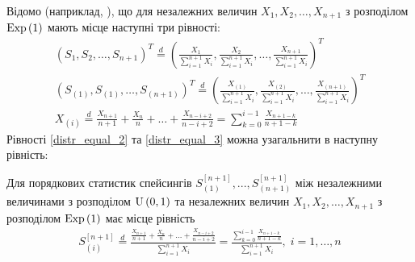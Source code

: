 Відомо (наприклад, \cite{Holst_1980}), що для незалежних величин 
$X_1, X_2, \dots, X_{n+1}$ з розподілом $\mathrm{Exp}\left(1\right)$
мають місце наступні три рівності:
\begin{gather}
    \label{distr_equal_1}
    \left(
        S_1, S_2, \dots, S_{n+1}
    \right)^T
    \overset{d}{=}
    \left(
        \frac{X_1}{\sum_{i=1}^{n+1} X_i},
        \frac{X_2}{\sum_{i=1}^{n+1} X_i},
        \dots,
        \frac{X_{n+1}}{\sum_{i=1}^{n+1} X_i}
    \right)^T \\
    \label{distr_equal_2}
    \left(
        S_{(1)}, S_{(1)}, \dots, S_{(n+1)}
    \right)^T
    \overset{d}{=}
    \left(
        \frac{X_{(1)}}{\sum_{i=1}^{n+1} X_i},
        \frac{X_{(2)}}{\sum_{i=1}^{n+1} X_i},
        \dots,
        \frac{X_{(n+1)}}{\sum_{i=1}^{n+1} X_i}
    \right)^T \\
    \label{distr_equal_3}
    X_{(i)} \overset{d}{=}
    \frac{X_{n+1}}{n+1} + \frac{X_{n}}{n} + \dots + \frac{X_{n-i+2}}{n-i+2} = 
    \sum_{k=0}^{i-1} \frac{X_{n+1-k}}{n+1-k}
\end{gather}
Рівності \eqref{distr_equal_2} та \eqref{distr_equal_3}
можна узагальнити в наступну рівність:
\begin{lemma}\label{distr_equal}
    Для порядкових статистик спейсингів 
    $S_{(1)}^{[n+1]}, ..., S_{(n+1)}^{[n+1]}$
    між незалежними величинами з розподілом $\mathrm{U}\left(0, 1\right)$
    та незалежних величин 
    $X_1, X_2, \dots, X_{n+1}$ з розподілом $\mathrm{Exp}\left(1\right)$ має місце
    рівність 
    \begin{gather}\label{distr_equal_4}
        S_{(i)}^{[n+1]} \overset{d}{=}
        \frac{
            \frac{X_{n+1}}{n+1} + \frac{X_{n}}{n} + \dots + \frac{X_{n-i+2}}{n-i+2}
        }{
            \sum_{i=1}^{n+1} X_i
        } = \frac{
            \sum_{k=0}^{i-1} \frac{X_{n+1-k}}{n+1-k}
        }{
            \sum_{i=1}^{n+1} X_i
        }, \; i = 1, \dots, n
    \end{gather}
\end{lemma}
